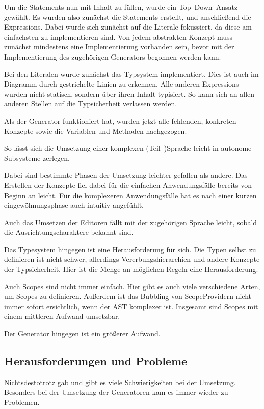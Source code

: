 Um die Statements nun mit Inhalt zu füllen, wurde ein Top--Down--Ansatz gewählt.
Es wurden also zunächst die Statements erstellt, und anschließend die Expressions.
Dabei wurde sich zunächst auf die Literale fokussiert, da diese am einfachsten zu implementieren sind.
Von jedem abstrakten Konzept muss zunächst mindestens eine Implementierung vorhanden sein, bevor mit der Implementierung des zugehörigen Generators begonnen werden kann.

Bei den Literalen wurde zunächst das Typsystem implementiert.
Dies ist auch im Diagramm durch gestrichelte Linien zu erkennen.
Alle anderen Expressions wurden nicht statisch, sondern über ihren Inhalt typisiert.
So kann sich an allen anderen Stellen auf die Typsicherheit verlassen werden.

Als der Generator funktioniert hat, wurden jetzt alle fehlenden, konkreten Konzepte sowie die Variablen und Methoden nachgezogen.

So lässt sich die Umsetzung einer komplexen (Teil--)Sprache leicht in autonome Subsysteme zerlegen.

Dabei sind bestimmte Phasen der Umsetzung leichter gefallen als andere.
Das Erstellen der Konzepte fiel dabei für die einfachen Anwendungsfälle bereits von Beginn an leicht.
Für die komplexeren Anwendungsfälle hat es nach einer kurzen eingewöhnungsphase auch intuitiv angefühlt.

Auch das Umsetzen der Editoren fällt mit der zugehörigen Sprache leicht, sobald die Ausrichtungscharaktere bekannt sind.

Das Typesystem hingegen ist eine Herausforderung für sich.
Die Typen selbst zu definieren ist nicht schwer, allerdings Vererbungshierarchien und andere Konzepte der Typsicherheit.
Hier ist die Menge an möglichen Regeln eine Herausforderung.

Auch Scopes sind nicht immer einfach.
Hier gibt es auch viele verschiedene Arten, um Scopes zu definieren.
Außerdem ist das Bubbling von {\ttfamily ScopeProvider}n nicht immer sofort ersichtlich, wenn der \ac{AST} komplexer ist.
Insgesamt sind Scopes mit einem mittleren Aufwand umsetzbar.

Der Generator hingegen ist ein größerer Aufwand.

\subsection{Herausforderungen und Probleme}\label{subsec:herausforderungen-und-probleme}
Nichtsdestotrotz gab und gibt es viele Schwierigkeiten bei der Umsetzung.
Besonders bei der Umsetzung der Generatoren kam es immer wieder zu Problemen.

